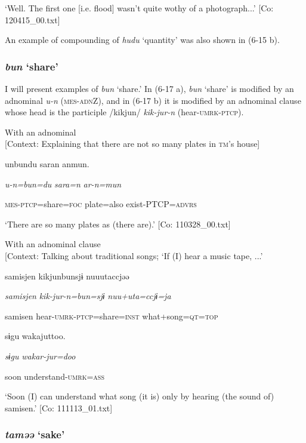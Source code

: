 \glt    ‘Well. The first one [i.e. flood] wasn’t quite wothy of a photograph...’ [Co: 120415\_00.txt]
\z

An example of compounding of \textit{hudu} ‘quantity’ was also shown in (6-15 b).

\subsubsection{\textit{bun} ‘share’}

I will present examples of \textit{bun} ‘share.’ In (6-17 a), \textit{bun} ‘share’ is modified by an adnominal \textit{u-n} (\textsc{mes}-\textsc{adn}Z), and in (6-17 b) it is modified by an adnominal clause whose head is the participle /kikjun/ \textit{kik-jur-n} (hear-\textsc{umrk}-\textsc{ptcp}).

\ea\label{ex:6-17}
\ea With an adnominal\\{}
[Context: Explaining that there are not so many plates in \textsc{tm}’s house]

{\TM}
\gll unbundu  saran  anmun.

      \textit{u-n=bun=du}  \textit{sara=n}  \textit{ar-n=mun}

      \textsc{mes}-\textsc{ptcp}=share=\textsc{foc}  plate=also  exist-PTCP=\textsc{advrs}

\glt ‘There are so many plates as (there are).’ [Co: 110328\_00.txt]
\z

 \ex With an adnominal clause\\{}
[Context: Talking about traditional songs; {\TM} ‘If (I) hear a music tape, ...’

{\TM}
\gll samisjen  kikjunbunsjɨ  nuuutaccjəə

      \textit{samisjen}  \textit{kik-jur-n=bun=sjɨ}  \textit{nuu+uta=ccjɨ=ja}

      samisen  hear-\textsc{umrk}-\textsc{ptcp}=share=\textsc{inst}  what+song=\textsc{qt}=\textsc{top}

      sɨgu  wakajuttoo.

      \textit{sɨgu}  \textit{wakar-jur=doo}

      soon  understand-\textsc{umrk}=\textsc{ass}

\glt ‘Soon (I) can understand what song (it is) only by hearing (the sound of) samisen.’ [Co: 111113\_01.txt]
\z

\subsubsection{\textit{taməə} ‘sake’}

